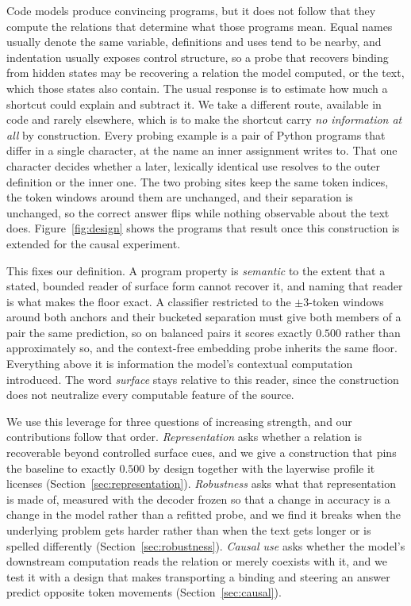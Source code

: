 \documentclass{article}
\begin{document}
Code models produce convincing programs, but it does not follow that they compute the relations that determine what those programs mean. Equal names usually denote the same variable, definitions and uses tend to be nearby, and indentation usually exposes control structure, so a probe that recovers binding from hidden states may be recovering a relation the model computed, or the text, which those states also contain. The usual response is to estimate how much a shortcut could explain and subtract it. We take a different route, available in code and rarely elsewhere, which is to make the shortcut carry \emph{no information at all} by construction. Every probing example is a pair of Python programs that differ in a single character, at the name an inner assignment writes to. That one character decides whether a later, lexically identical use resolves to the outer definition or the inner one. The two probing sites keep the same token indices, the token windows around them are unchanged, and their separation is unchanged, so the correct answer flips while nothing observable about the text does. Figure~\ref{fig:design} shows the programs that result once this construction is extended for the causal experiment.

This fixes our definition. A program property is \emph{semantic} to the extent that a stated, bounded reader of surface form cannot recover it, and naming that reader is what makes the floor exact. A classifier restricted to the $\pm3$-token windows around both anchors and their bucketed separation must give both members of a pair the same prediction, so on balanced pairs it scores exactly $0.500$ rather than approximately so, and the context-free embedding probe inherits the same floor. Everything above it is information the model's contextual computation introduced. The word \emph{surface} stays relative to this reader, since the construction does not neutralize every computable feature of the source.

We use this leverage for three questions of increasing strength, and our contributions follow that order. \emph{Representation} asks whether a relation is recoverable beyond controlled surface cues, and we give a construction that pins the baseline to exactly $0.500$ by design together with the layerwise profile it licenses (Section~\ref{sec:representation}). \emph{Robustness} asks what that representation is made of, measured with the decoder frozen so that a change in accuracy is a change in the model rather than a refitted probe, and we find it breaks when the underlying problem gets harder rather than when the text gets longer or is spelled differently (Section~\ref{sec:robustness}). \emph{Causal use} asks whether the model's downstream computation reads the relation or merely coexists with it, and we test it with a design that makes transporting a binding and steering an answer predict opposite token movements (Section~\ref{sec:causal}).
\end{document}
